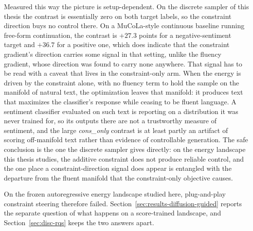 Measured this way the picture is setup-dependent. On the discrete sampler of this thesis the contrast is essentially zero on both target labels, so the constraint direction buys no control there. On a MuCoLa-style continuous baseline running free-form continuation, the contrast is $+27.3$ points for a negative-sentiment target and $+36.7$ for a positive one, which does indicate that the constraint gradient's direction carries some signal in that setting, unlike the fluency gradient, whose direction was found to carry none anywhere.
That signal has to be read with a caveat that lives in the constraint-only arm. When the energy is driven by the constraint alone, with no fluency term to hold the sample on the manifold of natural text, the optimization leaves that manifold: it produces text that maximizes the classifier's response while ceasing to be fluent language. A sentiment classifier evaluated on such text is reporting on a distribution it was never trained for, so its outputs there are not a trustworthy measure of sentiment, and the large \emph{cons\_only} contrast is at least partly an artifact of scoring off-manifold text rather than evidence of controllable generation. The safe conclusion is the one the discrete sampler gives directly: on the energy landscape this thesis studies, the additive constraint does not produce reliable control, and the one place a constraint-direction signal does appear is entangled with the departure from the fluent manifold that the constraint-only objective causes.

On the frozen autoregressive energy landscape studied here, plug-and-play constraint steering therefore failed. Section~\ref{sec:results-diffusion-guided} reports the separate question of what happens on a score-trained landscape, and Section~\ref{sec:disc-rqs} keeps the two answers apart.

